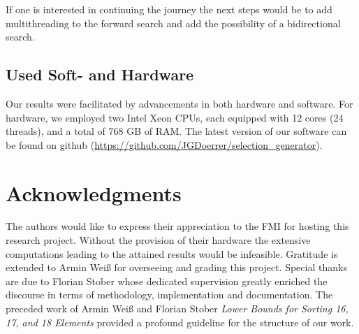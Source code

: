 \documentclass[10pt,journal,compsoc]{IEEEtran}
\begin{document}
If one is interested in continuing the journey the next steps would be to add multithreading to the forward search and add the possibility of a
bidirectional search.


\subsection{Used Soft- and Hardware} \label{sec:hardware}

Our results were facilitated by advancements in both hardware and software.
For hardware, we employed two Intel Xeon CPUs, each equipped with 12 cores (24 threads), and a total of 768 GB of RAM. %
The latest version of our software can be found on github (\url{https://github.com/JGDoerrer/selection_generator}).





\section*{Acknowledgments}

The authors would like to express their appreciation to the FMI for hosting this research project.
Without the provision of their hardware the extensive computations leading to the attained results would be infeasible.
Gratitude is extended to Armin Weiß for overseeing and grading this project.
Special thanks are due to Florian Stober whose dedicated supervision greatly enriched the discourse in terms of methodology, implementation and documentation.
The preceded work of Armin Weiß and Florian Stober \textit{Lower Bounds for Sorting 16, 17, and 18 Elements} \cite{stober2022lower} provided a profound guideline for the structure of our work.

\ifCLASSOPTIONcaptionsoff
  \newpage
\fi




\end{document}
